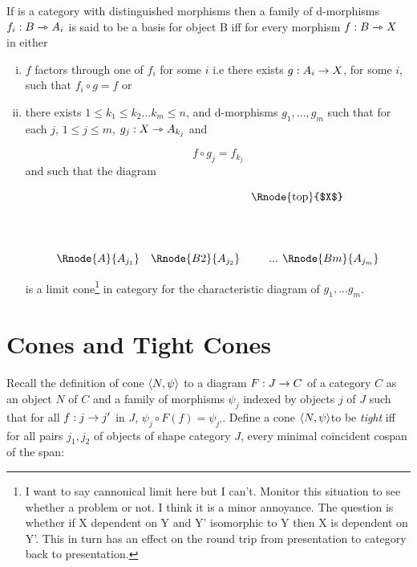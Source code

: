 \documentclass[10pt,a4paper]{article}
\begin{document}
\begin{definition}
If  is a category with distinguished morphisms then a family of 
d-morphisms  $f_i: B \rightarrowtriangle A_i$ is said to
be a basis for object B iff for every morphism $f: B \rightarrowtriangle X$ in  either 
\begin{enumerate}[(i)]
\item
$f$ factors through one of $f_i$ for some $i$ i.e there exists $g:A_i \rightarrow X$, for some $i$, such that $f_i \circ g = f$ or
\item
there exists $1 \leq k_1 \leq k_2 ... k_m \leq n$, and d-morphisms 
$g_1,...,g_m$ such that for each $j$, $1 \leq j \leq m$, 
$g_j: X \rightarrowtriangle A_{k_j}$ and

$$
f \circ g_j = f_{k_j}
$$
and such that the diagram

\begin{center}
\setlength{\arraycolsep}{0.3cm}
\begin{displaymath}
\begin{array}{ccp{0.2cm}p{0.075cm}c}
&&\Rnode{top}{$X$}& & \\[1.5cm]
\Rnode{A}{A_{j_1}}&\Rnode{B2}{A_{j_2}}&& ... & \Rnode{Bm}{A_{j_m}}\\
\end{array}
\end{displaymath}
\end{center}

is a limit cone\footnote{I want to say cannonical limit here but I can't.
Monitor this situation to see whether a problem or not. I think it is a minor annoyance. The question is whether if X dependent on Y and Y' isomorphic to Y then X is dependent on Y'. This in turn has an effect on the round trip from presentation to category back to presentation. } in category  for the characteristic diagram of $g_1,...g_m$.
\end{enumerate}

\end{definition}

\section{Cones and Tight Cones}
Recall the definition of cone $\left\langle N,\psi\right\rangle$ to a diagram $F:J \rightarrow C$ of a category $C$ as an object $N$ of $C$ and a family of morphisms $\psi_j$ indexed by objects $j$ of $J$ such that for all $f: j \rightarrow j'$ in $J$, $\psi_j \circ F(f) = \psi_{j'}$. Define a cone $\left\langle N,\psi\right\rangle$to be \textit{tight} iff for all pairs $j_1,j_2$ of objects of shape category $J$, every minimal coincident cospan of the span:
\end{document}
